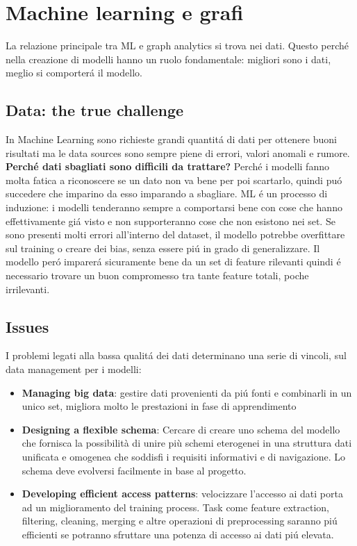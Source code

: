 \section{Machine learning e grafi}
La relazione principale tra ML e graph analytics si trova nei dati. Questo perché nella creazione di modelli hanno un ruolo fondamentale: migliori sono i dati, meglio si comporterá il modello. 
\subsection{Data: the true challenge}
In Machine Learning sono richieste grandi quantitá di dati per ottenere buoni risultati ma le data sources sono sempre piene di errori, valori anomali e rumore. \textbf{Perché dati sbagliati sono difficili da trattare?} Perché i modelli fanno molta fatica a riconoscere se un dato non va bene per poi scartarlo, quindi puó succedere che imparino da esso imparando a sbagliare. ML é un processo di induzione: i modelli tenderanno sempre a comportarsi bene con cose che hanno effettivamente giá visto e non supporteranno cose che non esistono nei set. Se sono presenti molti errori all'interno del dataset, il modello potrebbe overfittare sul training o creare dei bias, senza essere piú in grado di generalizzare. Il modello peró imparerá sicuramente bene da un set di feature rilevanti quindi é necessario trovare un buon compromesso tra tante feature totali, poche irrilevanti. 

\subsection{Issues}
I problemi legati alla bassa qualitá dei dati determinano una serie di vincoli, sul data management per i modelli:
\begin{itemize}
    \item \textbf{Managing big data}: gestire dati provenienti da piú fonti e combinarli in un unico set, migliora molto le prestazioni in fase di apprendimento
    \item \textbf{Designing a flexible schema}: Cercare di creare uno schema del modello che fornisca la possibilità di unire più schemi eterogenei in una struttura dati unificata e omogenea che soddisfi i requisiti informativi e di navigazione. Lo schema deve evolversi facilmente in base al progetto.
    \item \textbf{Developing efficient access patterns}: velocizzare l'accesso ai dati porta ad un miglioramento del training process. Task come feature extraction, filtering, cleaning, merging e altre operazioni di preprocessing saranno piú efficienti se potranno sfruttare una potenza di accesso ai dati piú elevata.
\end{itemize}

